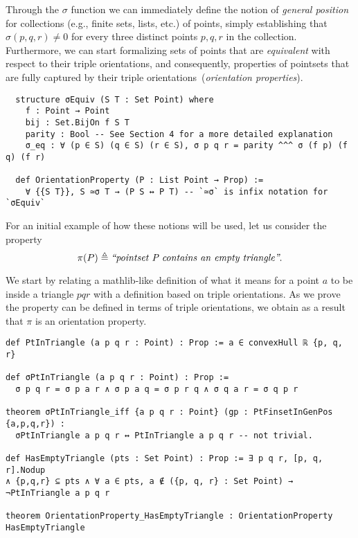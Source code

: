 Through the $\sigma$ function we can immediately define the notion of \emph{general position} for collections (e.g., finite sets, lists, etc.) of points, simply establishing that $\sigma(p, q, r) \neq 0$ for every three distinct points $p, q, r$ in the collection.
Furthermore, we can start formalizing sets of points that are \emph{equivalent} with respect to their triple orientations, and consequently, properties of pointsets that are fully captured by their triple orientations~(\emph{orientation properties}).
% 
\begin{lstlisting}
  structure σEquiv (S T : Set Point) where
    f : Point → Point
    bij : Set.BijOn f S T
    parity : Bool -- See Section 4 for a more detailed explanation
    σ_eq : ∀ (p ∈ S) (q ∈ S) (r ∈ S), σ p q r = parity ^^^ σ (f p) (f q) (f r)

  def OrientationProperty (P : List Point → Prop) :=
    ∀ {{S T}}, S ≃σ T → (P S ↔ P T) -- `≃σ` is infix notation for `σEquiv`
\end{lstlisting}

For an initial example of how these notions will be used, let us consider the property
\[
  \pi(P) \triangleq \text{\em ``pointset P contains an empty triangle''}.
\]

We start by relating a \textsf{mathlib}-like definition of what it means for a point $a$ to be inside a triangle $pqr$ with a definition based on triple orientations. As we prove the property can be defined in terms of triple orientations, we obtain as a result that $\pi$ is an orientation property.

\begin{lstlisting}
def PtInTriangle (a p q r : Point) : Prop := a ∈ convexHull ℝ {p, q, r}

def σPtInTriangle (a p q r : Point) : Prop :=
  σ p q r = σ p a r ∧ σ p a q = σ p r q ∧ σ q a r = σ q p r

theorem σPtInTriangle_iff {a p q r : Point} (gp : PtFinsetInGenPos {a,p,q,r}) :
  σPtInTriangle a p q r ↔ PtInTriangle a p q r -- not trivial.

def HasEmptyTriangle (pts : Set Point) : Prop := ∃ p q r, [p, q, r].Nodup
∧ {p,q,r} ⊆ pts ∧ ∀ a ∈ pts, a ∉ ({p, q, r} : Set Point) → ¬PtInTriangle a p q r

theorem OrientationProperty_HasEmptyTriangle : OrientationProperty HasEmptyTriangle
\end{lstlisting}

